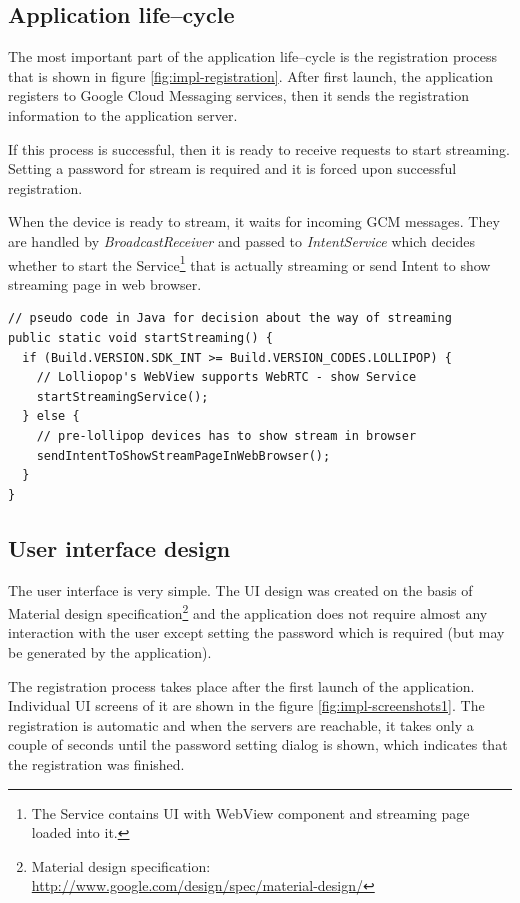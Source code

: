 \subsection{Application life--cycle}
The most important part of the application life--cycle is the registration process that is shown in figure \ref{fig:impl-registration}. After first launch, the application registers to Google Cloud Messaging services, then it sends the registration information to the application server.

If this process is successful, then it is ready to receive requests to start streaming. Setting a password for stream is required and it is forced upon successful registration.


When the device is ready to stream, it waits for incoming GCM messages. They are handled by \textit{BroadcastReceiver} and passed to \textit{IntentService} which decides whether to start the Service\footnote{The Service contains UI with WebView component and streaming page loaded into it.} that is actually streaming or send Intent to show streaming page in web browser.

\begin{lstlisting}
// pseudo code in Java for decision about the way of streaming 
public static void startStreaming() {
  if (Build.VERSION.SDK_INT >= Build.VERSION_CODES.LOLLIPOP) {
    // Lolliopop's WebView supports WebRTC - show Service
    startStreamingService();
  } else {
    // pre-lollipop devices has to show stream in browser
    sendIntentToShowStreamPageInWebBrowser();
  }
}
\end{lstlisting}


\subsection{User interface design}
The user interface is very simple. The UI design was created on the basis of Material design specification\footnote{Material design specification:\\ \url{http://www.google.com/design/spec/material-design/}} and the application does not require almost any interaction with the user except setting the password which is required (but may be generated by the application).

The registration process takes place after the first launch of the application. Individual UI screens of it are shown in the figure \ref{fig:impl-screenshots1}. The registration is automatic and when the servers are reachable, it takes only a couple of seconds until the password setting dialog is shown, which indicates that the registration was finished.

